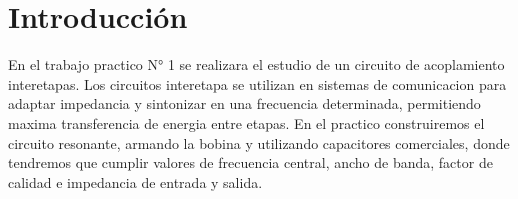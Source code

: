 \section{Introducción}

En el trabajo practico N° 1 se realizara el estudio de un circuito de acoplamiento interetapas. Los circuitos interetapa se utilizan en sistemas 
de comunicacion para adaptar impedancia y sintonizar en una frecuencia determinada, permitiendo maxima transferencia de energia entre etapas.
En el practico construiremos el circuito resonante, armando la bobina y utilizando capacitores comerciales, donde tendremos que cumplir valores de frecuencia central, ancho 
de banda, factor de calidad e impedancia de entrada y salida.
